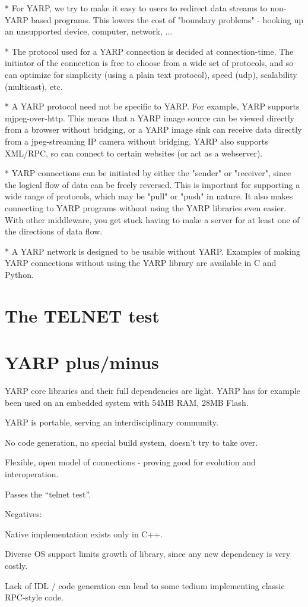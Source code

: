\documentclass[letterpaper]{article}
\begin{document}
* For YARP, we try to make it easy to users to redirect data streams to non-YARP based programs.  This lowers the cost of "boundary problems" - hooking up an unsupported device, computer, network, ...

* The protocol used for a YARP connection is decided at connection-time.  The initiator of the connection is free to choose from a wide set of protocols, and so can optimize for simplicity (using a plain text protocol), speed (udp), scalability (multicast), etc.  

* A YARP protocol need not be specific to YARP.  For example, YARP supports mjpeg-over-http.  This means that a YARP image source can be viewed directly from a browser without bridging, or a YARP image sink can receive data directly from a jpeg-streaming IP camera without bridging.  YARP also supports XML/RPC, so can connect to certain websites (or act as a webserver).

* YARP connections can be initiated by either the "sender" or "receiver", since the logical flow of data can be freely reversed.  This is important for supporting a wide range of protocols, which may be "pull" or "push" in nature.  It also makes connecting to YARP programs without using the YARP libraries even easier.  With other middleware, you get stuck having to make a server for at least one of the directions of data flow.

* A YARP network is designed to be usable without YARP.  Examples of making YARP connections without using the YARP library are available in C and Python.


\section{The TELNET test}


\section{YARP plus/minus}

YARP core libraries and their full dependencies are light.
YARP has for example been used on an embedded system
with 54MB RAM, 28MB Flash.

YARP is portable, serving an interdisciplinary community.

No code generation, no special build system, doesn't try to take over.

Flexible, open model of connections - proving good for evolution and interoperation.

Passes the ``telnet test''.

Negatives:

Native implementation exists only in C++.  

Diverse OS support limits growth of library, since any
new dependency is very costly.

Lack of IDL / code generation can lead to some tedium
implementing classic RPC-style code.




\end{document}
